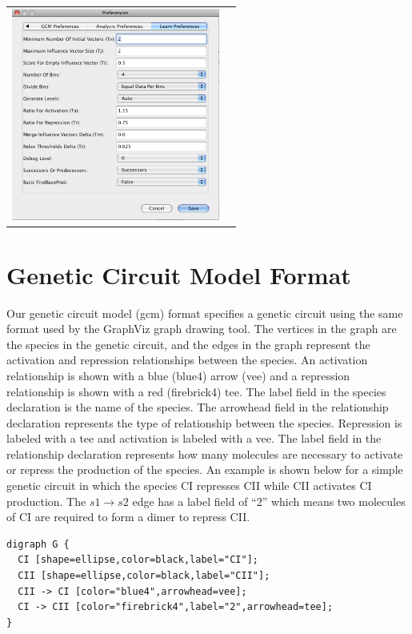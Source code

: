 \documentclass[titlepage,11pt]{article}
\begin{document}
\begin{center}
\begin{tabular}{cc}
\includegraphics[height=70mm]{screenshots/LearnPref}
\end{tabular}
\end{center}

\section{\label{GCM}Genetic Circuit Model Format}

\noindent
Our genetic circuit model (gcm) format specifies a genetic
circuit using the same format used by the GraphViz graph drawing
tool.  The vertices in the graph are the species in
the genetic circuit, and the edges in the graph represent the
activation and repression relationships between the species. An
activation relationship is shown with a blue (blue4) arrow (vee)
and a repression relationship is shown with a red (firebrick4)
tee. The label field in the species declaration is the name of
the species. The arrowhead field in the relationship declaration
represents the type of relationship between the species.
Repression is labeled with a tee and activation is labeled with a
vee. The label field in the relationship declaration represents
how many molecules are necessary to activate or repress the
production of the species. An example is shown below for a simple
genetic circuit in which the species CI represses CII while CII
activates CI production. The $s1 \rightarrow s2$ edge has a label field of
``2'' which means two molecules of CI are required to form a dimer 
to repress CII. 

\begin{verbatim}
digraph G {
  CI [shape=ellipse,color=black,label="CI"];
  CII [shape=ellipse,color=black,label="CII"];
  CII -> CI [color="blue4",arrowhead=vee];
  CI -> CII [color="firebrick4",label="2",arrowhead=tee];
}
\end{verbatim}
\end{document}
